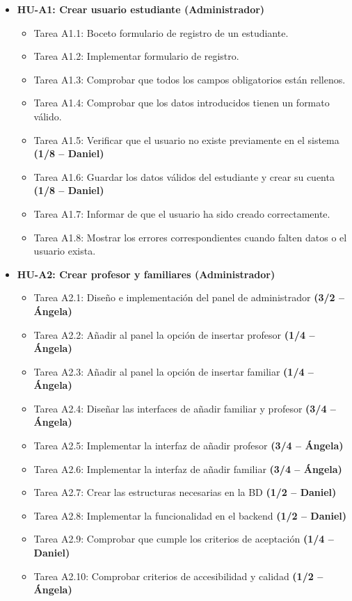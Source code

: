 \begin{itemize}[leftmargin=1.2em, itemsep=4pt]
    \item \textbf{HU-A1: Crear usuario estudiante (Administrador)}
    \begin{itemize}[label=$\circ$, leftmargin=1.5em, itemsep=2pt]
        \item \textsf{Tarea A1.1:} Boceto formulario de registro de un estudiante.
        \item \textsf{Tarea A1.2:} Implementar formulario de registro.
        \item \textsf{Tarea A1.3:} Comprobar que todos los campos obligatorios están rellenos.
        \item \textsf{Tarea A1.4:} Comprobar que los datos introducidos tienen un formato válido.
        \item \textsf{Tarea A1.5:} Verificar que el usuario no existe previamente en el sistema \hfill \textbf{(1/8 -- Daniel)}
        \item \textsf{Tarea A1.6:} Guardar los datos válidos del estudiante y crear su cuenta \hfill \textbf{(1/8 -- Daniel)}
        \item \textsf{Tarea A1.7:} Informar de que el usuario ha sido creado correctamente.
        \item \textsf{Tarea A1.8:} Mostrar los errores correspondientes cuando falten datos o el usuario exista.
    \end{itemize}

    \item \textbf{HU-A2: Crear profesor y familiares (Administrador)}
    \begin{itemize}[label=$\circ$, leftmargin=1.5em, itemsep=2pt]
        \item \textsf{Tarea A2.1:} Diseño e implementación del panel de administrador \hfill \textbf{(3/2 -- Ángela)}
        \item \textsf{Tarea A2.2:} Añadir al panel la opción de insertar profesor \hfill \textbf{(1/4 -- Ángela)}
        \item \textsf{Tarea A2.3:} Añadir al panel la opción de insertar familiar \hfill \textbf{(1/4 -- Ángela)}
        \item \textsf{Tarea A2.4:} Diseñar las interfaces de añadir familiar y profesor \hfill \textbf{(3/4 -- Ángela)}
        \item \textsf{Tarea A2.5:} Implementar la interfaz de añadir profesor \hfill \textbf{(3/4 -- Ángela)}
        \item \textsf{Tarea A2.6:} Implementar la interfaz de añadir familiar \hfill \textbf{(3/4 -- Ángela)}
        \item \textsf{Tarea A2.7:} Crear las estructuras necesarias en la BD \hfill \textbf{(1/2 -- Daniel)}
        \item \textsf{Tarea A2.8:} Implementar la funcionalidad en el backend \hfill \textbf{(1/2 -- Daniel)}
        \item \textsf{Tarea A2.9:} Comprobar que cumple los criterios de aceptación \hfill \textbf{(1/4 -- Daniel)}
        \item \textsf{Tarea A2.10:} Comprobar criterios de accesibilidad y calidad \hfill \textbf{(1/2 -- Ángela)}
    \end{itemize}


\end{itemize}
